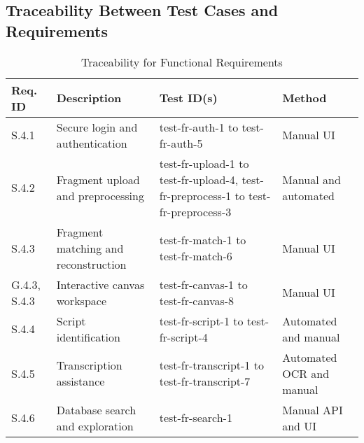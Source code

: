 \documentclass[12pt, titlepage]{article}
\begin{document}
\newpage
\subsection{Traceability Between Test Cases and Requirements}

\begin{table}[ht]
    \centering
    \begin{tabular}{|p{2cm}|p{4cm}|p{4cm}|p{2.5cm}|}
        \hline
        \textbf{Req. ID} & \textbf{Description} & \textbf{Test ID(s)} & \textbf{Method} \\
        \hline
        S.4.1 & Secure login and authentication & test-fr-auth-1 to test-fr-auth-5 & Manual UI \\
        \hline
        S.4.2 & Fragment upload and preprocessing & test-fr-upload-1 to test-fr-upload-4, test-fr-preprocess-1 to test-fr-preprocess-3 & Manual and automated \\
        \hline
        S.4.3 & Fragment matching and reconstruction & test-fr-match-1 to test-fr-match-6 & Manual UI \\
        \hline
        G.4.3, S.4.3 & Interactive canvas workspace & test-fr-canvas-1 to test-fr-canvas-8 & Manual UI \\
        \hline
        S.4.4 & Script identification & test-fr-script-1 to test-fr-script-4 & Automated and manual \\
        \hline
        S.4.5 & Transcription assistance & test-fr-transcript-1 to test-fr-transcript-7 & Automated OCR and manual \\
        \hline
        S.4.6 & Database search and exploration & test-fr-search-1 & Manual API and UI \\
        \hline
    \end{tabular}
    \caption{Traceability for Functional Requirements}
\end{table}
\end{document}
